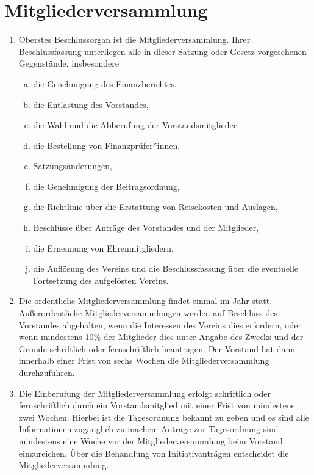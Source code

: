 \documentclass[a4paper]{article}
\begin{document}
\section{Mitgliederversammlung}
\begin{enumerate}
    \item Oberstes Beschlussorgan ist die Mitgliederversammlung. Ihrer Beschlussfassung unterliegen alle in dieser Satzung oder Gesetz vorgesehenen Gegenstände, insbesondere
    \begin{enumerate}[a)]
        \item die Genehmigung des Finanzberichtes,
        \item die Entlastung des Vorstandes,
        \item die Wahl und die Abberufung der Vorstandsmitglieder,
        \item die Bestellung von Finanzprüfer*innen,
        \item Satzungsänderungen,
        \item die Genehmigung der Beitragsordnung,
        \item die Richtlinie über die Erstattung von Reisekosten und Auslagen,
        \item Beschlüsse über Anträge des Vorstandes und der Mitglieder,
        \item die Ernennung von Ehrenmitgliedern,
        \item die Auflösung des Vereins und die Beschlussfassung über die eventuelle Fortsetzung des aufgelösten Vereins.
    \end{enumerate}
    \item Die ordentliche Mitgliederversammlung findet einmal im Jahr statt. Außerordentliche Mitgliederversammlungen werden auf Beschluss des Vorstandes abgehalten, wenn die Interessen des Vereins dies erfordern, oder wenn mindestens 10\% der Mitglieder dies unter Angabe des Zwecks und der Gründe schriftlich oder fernschriftlich beantragen. Der Vorstand hat dann innerhalb einer Frist von sechs Wochen die Mitgliederversammlung durchzuführen.

    \item Die Einberufung der Mitgliederversammlung erfolgt schriftlich oder fernschriftlich durch ein Vorstandsmitglied mit einer Frist von mindestens zwei Wochen. Hierbei ist die Tagesordnung bekannt zu geben und es sind alle Informationen zugänglich zu machen. Anträge zur Tagesordnung sind mindestens eine Woche vor der Mitgliederversammlung beim Vorstand einzureichen. Über die Behandlung von Initiativanträgen entscheidet die Mitgliederversammlung.


\end{enumerate}
\end{document}
